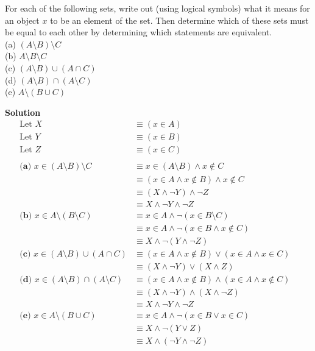 \begin{tcolorbox}[title=Problem 9, breakable]
For each of the following sets, write out (using logical symbols) what it means
for an object $x$ to be an element of the set. Then determine which of these sets
must be equal to each other by determining which statements are equivalent. \\
(a) $(A \setminus B) \setminus C$ \\
(b) $A \setminus B \setminus C$ \\
(c) $(A \setminus B) \cup (A \cap C)$ \\
(d) $(A \setminus B) \cap (A \setminus C)$ \\
(e) $A \setminus (B \cup C)$ \\
\end{tcolorbox}

\textbf{Solution}
\begin{align*}
\text{Let } X &\equiv (x \in A) & \\
\text{Let } Y &\equiv (x \in B) & \\
\text{Let } Z &\equiv (x \in C) & \\& \\
\textbf{(a) } x \in (A \setminus B) \setminus C 
    &\equiv x \in (A \setminus B) \wedge x \not \in C & \\
    &\equiv (x \in A \wedge x \not \in B) \wedge x \not \in C & \\
    &\equiv (X \wedge \neg Y) \wedge \neg Z & \\
    &\equiv X \wedge \neg Y \wedge \neg Z & \\ 
\textbf{(b) } x \in A \setminus (B \setminus C) 
    &\equiv x \in A \wedge \neg(x \in B \setminus C) & \\
    &\equiv x \in A \wedge \neg(x \in B \wedge x \not \in C) & \\
    &\equiv X \wedge \neg(Y \wedge \neg Z) & \\
\textbf{(c) } x \in (A \setminus B) \cup (A \cap C) 
    &\equiv (x \in A \wedge x \not \in B) \vee (x \in A \wedge x \in C) & \\
    &\equiv (X \wedge \neg Y) \vee (X \wedge Z) & \\ 
\textbf{(d) } x \in (A \setminus B) \cap (A \setminus C) 
    &\equiv (x \in A \wedge x \not \in B) \wedge (x \in A \wedge x \not \in C) & \\
    &\equiv (X \wedge \neg Y) \wedge (X \wedge \neg Z) & \\ 
    &\equiv X \wedge \neg Y \wedge \neg Z & \\ 
\textbf{(e) } x \in A \setminus (B \cup C) 
    &\equiv x \in A \wedge \neg (x \in B \vee x \in C) & \\
    &\equiv X \wedge \neg (Y \vee Z) & \\
    &\equiv X \wedge (\neg Y \wedge \neg Z) 
\end{align*}

